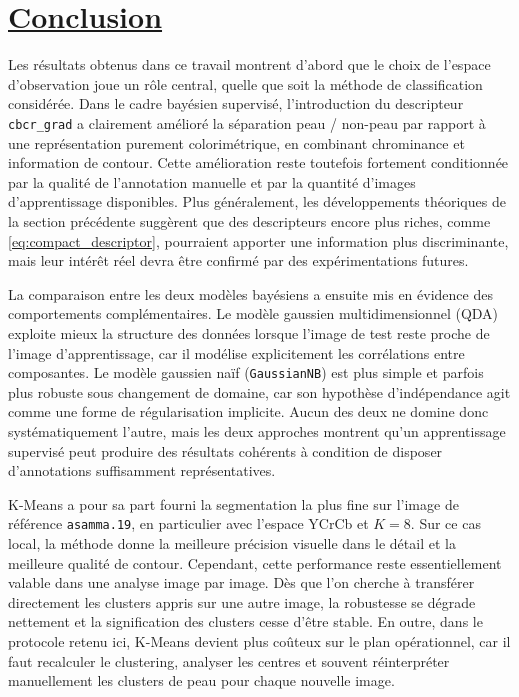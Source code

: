 \section{\underline{\textbf{Conclusion}}}

Les r\'esultats obtenus dans ce travail montrent d'abord que le choix de l'espace d'observation joue un r\^ole central, quelle que soit la m\'ethode de classification consid\'er\'ee. Dans le cadre bay\'esien supervis\'e, l'introduction du descripteur \texttt{cbcr\_grad} a clairement am\'elior\'e la s\'eparation peau / non-peau par rapport \`a une repr\'esentation purement colorim\'etrique, en combinant chrominance et information de contour. Cette am\'elioration reste toutefois fortement conditionn\'ee par la qualit\'e de l'annotation manuelle et par la quantit\'e d'images d'apprentissage disponibles. Plus g\'en\'eralement, les d\'eveloppements th\'eoriques de la section pr\'ec\'edente sugg\`erent que des descripteurs encore plus riches, comme \eqref{eq:compact_descriptor}, pourraient apporter une information plus discriminante, mais leur int\'er\^et r\'eel devra \^etre confirm\'e par des exp\'erimentations futures.

La comparaison entre les deux mod\`eles bay\'esiens a ensuite mis en \'evidence des comportements compl\'ementaires. Le mod\`ele gaussien multidimensionnel (QDA) exploite mieux la structure des donn\'ees lorsque l'image de test reste proche de l'image d'apprentissage, car il mod\'elise explicitement les corr\'elations entre composantes. Le mod\`ele gaussien na\"if (\texttt{GaussianNB}) est plus simple et parfois plus robuste sous changement de domaine, car son hypoth\`ese d'ind\'ependance agit comme une forme de r\'egularisation implicite. Aucun des deux ne domine donc syst\'ematiquement l'autre, mais les deux approches montrent qu'un apprentissage supervis\'e peut produire des r\'esultats coh\'erents \`a condition de disposer d'annotations suffisamment repr\'esentatives.

K-Means a pour sa part fourni la segmentation la plus fine sur l'image de r\'ef\'erence \texttt{asamma.19}, en particulier avec l'espace YCrCb et \(K=8\). Sur ce cas local, la m\'ethode donne la meilleure pr\'ecision visuelle dans le d\'etail et la meilleure qualit\'e de contour. Cependant, cette performance reste essentiellement valable dans une analyse image par image. D\`es que l'on cherche \`a transf\'erer directement les clusters appris sur une autre image, la robustesse se d\'egrade nettement et la signification des clusters cesse d'\^etre stable. En outre, dans le protocole retenu ici, K-Means devient plus co\^uteux sur le plan op\'erationnel, car il faut recalculer le clustering, analyser les centres et souvent r\'einterpr\'eter manuellement les clusters de peau pour chaque nouvelle image.

